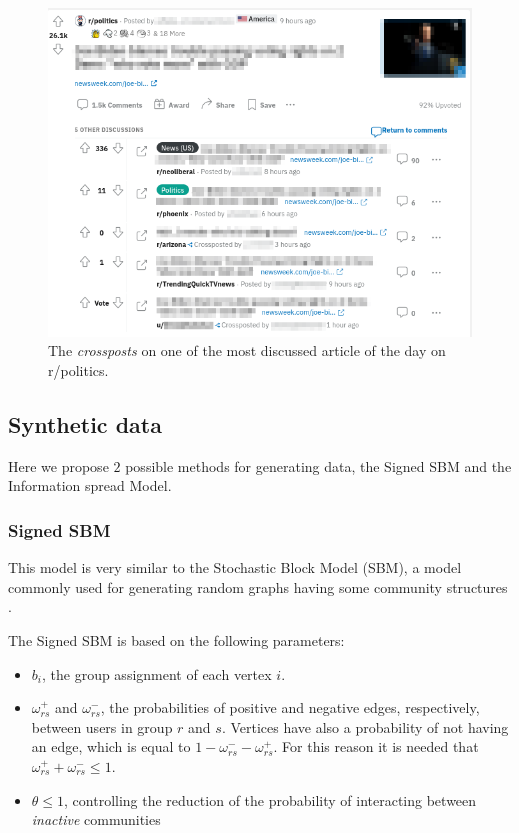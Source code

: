 \begin{figure}
	\centering
	\includegraphics[width=0.8\linewidth]{tex/img/reddit-crossposts.png}
	\caption{The \emph{crossposts} on one of the most discussed article of the
		day on r/politics.}%
	\label{fig:tex/img/reddit-crossposts}
\end{figure}

\subsection{Synthetic data}%
\label{sub:synthetic_data}

Here we propose $2$ possible methods for generating data, the Signed SBM and
the Information spread Model.

\subsubsection{Signed SBM}%
\label{ssub:signed_sbm}

This model is very similar to the Stochastic Block Model (SBM), a model
commonly used for generating random graphs having some community structures
\cite{Newman2018}.

The Signed SBM is based on the following parameters:
\begin{itemize}
	\item $b_{i} $, the group assignment of each vertex $i$.
	\item $\omega ^{+} _{rs} $ and $\omega ^{-} _{rs} $, the probabilities
	      of positive and negative edges, respectively, between users in
	      group $r$ and $s$. Vertices have also a probability of not having an
	      edge, which is equal to $1 - \omega ^{-} _{rs} - \omega ^{+} _{rs} $.
	      For this reason it is needed that $\omega ^{+} _{rs} + \omega ^{-} _{rs} \leq 1$.
	\item $\theta \leq 1$, controlling the reduction of the probability of interacting
	      between \emph{inactive} communities
\end{itemize}

